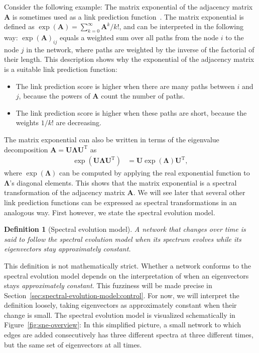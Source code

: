 \documentclass[11pt,a4paper]{book}
\newtheorem{mydef}{Definition}
\begin{document}
Consider the following example:
The matrix exponential of the adjacency matrix $\mathbf A$ is sometimes
used as a link prediction function~\cite{b156}.  The matrix exponential is
defined as $\exp(\mathbf A)=\sum_{k=0}^\infty \mathbf A^k/k!$, and can
be interpreted in the following way:  $\exp(\mathbf A)_{ij}$ equals a
weighted sum over all paths from the node $i$ to the node $j$ in the
network, where paths 
are weighted by the inverse of the factorial of their length. 
This description shows why the exponential of the adjacency matrix is a
suitable link prediction function:
\begin{itemize}
\item The link prediction score is higher when there are many paths
  between $i$ and $j$, because the powers of $\mathbf A$ count the
  number of paths.
\item The link prediction score is higher when these paths are short,
  because the weights $1/k!$ are decreasing. 
\end{itemize}
The matrix exponential can also be written in terms of the eigenvalue
decomposition $\mathbf A = \mathbf U \mathbf \Lambda \mathbf U^{\mathrm
  T}$ as
\begin{align*}
  \exp(\mathbf U\mathbf \Lambda \mathbf U^{\mathrm T}) &= \mathbf U \exp(\mathbf
  \Lambda) \mathbf U^{\mathrm T},
\end{align*}
where $\exp(\mathbf \Lambda)$ can be computed by applying the real exponential
function to $\mathbf \Lambda$'s diagonal elements.  
This shows that the matrix exponential is a spectral transformation of
the adjacency matrix $\mathbf A$.
We will see later that several other link prediction functions can be
expressed as spectral transformations in an analogous way.  First however, we state the
spectral evolution model.

\begin{mydef}[Spectral evolution model]
  A network that changes over time is said to follow the spectral
  evolution model when its spectrum evolves while its eigenvectors stay
  approximately constant. 
\end{mydef}

This definition is not mathematically strict.  Whether a network
conforms to the spectral evolution model depends on the interpretation
of when an eigenvectors stays \emph{approximately constant}.  This
fuzziness will be made 
precise in Section~\ref{sec:spectral-evolution-model:control}.  For now,
we will interpret the 
definition loosely, taking eigenvectors as approximately constant when
their change is small. 
The spectral evolution model is visualized schematically in
Figure~\ref{fig:sne-overview}:  In this simplified picture, a small network
to which edges are added consecutively has three different spectra at
three different times, but the same set of eigenvectors at all times. 
\end{document}
